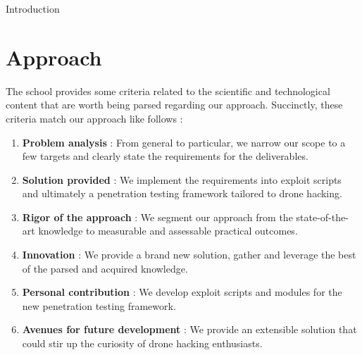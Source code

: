 \begin{chaptercover}{Introduction}
\section{Approach}
The school provides some criteria related to the scientific and technological content that are worth being parsed regarding our approach. Succinctly, these criteria match our approach like follows :
{\hyphenation{}
\begin{enumerate}[itemsep=0.1cm,topsep=0.1cm]
  \item {\color{FirstBlue}\bfseries Problem analysis} : From general to particular, we narrow our scope to a few targets and clearly state the requirements for the deliverables.
  \item {\color{FirstBlue}\bfseries Solution provided} : We implement the requirements into exploit scripts and ultimately a penetration testing framework tailored to drone hacking.
  \item {\color{FirstBlue}\bfseries Rigor of the approach} : We segment our approach from the state-of-the-art knowledge to measurable and assessable practical outcomes.
  \item {\color{FirstBlue}\bfseries Innovation} : We provide a brand new solution, gather and leverage the best of the parsed and acquired knowledge.
  \item {\color{FirstBlue}\bfseries Personal contribution} : We develop exploit scripts and modules for the new penetration testing framework.
  \item {\color{FirstBlue}\bfseries Avenues for future development} : We provide an extensible solution that could stir up the curiosity of drone hacking enthusiasts.
\end{enumerate}}


\end{chaptercover}
